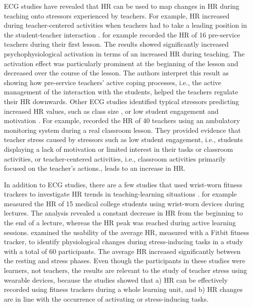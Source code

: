 \documentclass[preprint, 3p,
authoryear]{elsarticle} %
\begin{document}
ECG studies have revealed that HR can be used to map changes in HR
during teaching onto stressors experienced by teachers. For example, HR
increased during teacher-centered activities when teachers had to take a
leading position in the student-teacher interaction
\citep{sperka1995, scheuch1997psychophysische, donker2018, junker2021}.
\citet{sperka1995} for example recorded the HR of 16 pre-service
teachers during their first lesson. The results showed significantly
increased psychophysiological activation in terms of an increased HR
during teaching. The activation effect was particularly prominent at the
beginning of the lesson and decreased over the course of the lesson. The
authors interpret this result as showing how pre-service teachers'
active coping processes, i.e., the active management of the interaction
with the students, helped the teachers regulate their HR downwards.
Other ECG studies identified typical stressors predicting increased HR
values, such as class size \citep{huang2022class}, or low student
engagement and motivation \citep{junker2021}. For example,
\citet{junker2021} recorded the HR of 40 teachers using an ambulatory
monitoring system during a real classroom lesson. They provided evidence
that teacher stress caused by stressors such as low student engagement,
i.e., students displaying a lack of motivation or limited interest in
their tasks or classroom activities, or teacher-centered activities,
i.e., classroom activities primarily focused on the teacher's actions.,
leads to an increase in HR.

In addition to ECG studies, there are a few studies that used wrist-worn
fitness trackers to investigate HR trends in teaching-learning
situations \citep{Darnell2019, chalmers2021}. \citet{Darnell2019} for
example measured the HR of 15 medical college students using wrist-worn
devices during lectures. The analysis revealed a constant decrease in HR
from the beginning to the end of a lecture, whereas the HR peak was
reached during active learning sessions. \citet{chalmers2021} examined
the usability of the average HR, measured with a Fitbit fitness tracker,
to identify physiological changes during stress-inducing tasks in a
study with a total of 60 participants. The average HR increased
significantly between the resting and stress phases. Even though the
participants in these studies were learners, not teachers, the results
are relevant to the study of teacher stress using wearable devices,
because the studies showed that a) HR can be effectively recorded using
fitness trackers during a whole learning unit, and b) HR changes are in
line with the occurrence of activating or stress-inducing tasks.
\end{document}
